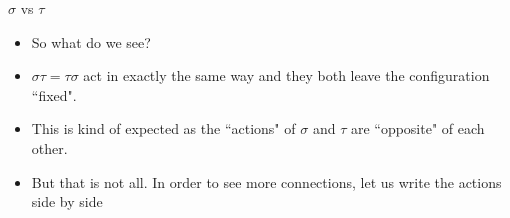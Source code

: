 \documentclass[ %
 10pt, xcolor={dvipsnames,svgnames,x11names,hyperref},
   hyperref={colorlinks=true,citecolor=green,linkcolor=DarkRed,urlcolor=ProcessBlue,anchorcolor=blue}
  ]{beamer}
\newenvironment{stepitemize}{\begin{itemize}[<+->]}{\end{itemize} }
\begin{document}
\begin{frame}{$\sigma$ vs $\tau$}
\begin{stepitemize}
\begin{center}
\end{center}

\bigskip

\item So what do we see?
\item $\sigma\tau = \tau\sigma$ act in exactly the same way and they both leave the configuration ``fixed".
\item This is kind of expected as the ``actions" of $\sigma$ and $\tau$ are ``opposite" of each other. 
\item But that is not all. In order to see more connections, let us write the actions side by side
\end{stepitemize}
\end{frame}
\end{document}
